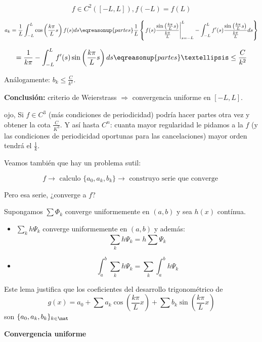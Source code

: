 		\[ f \in C^2 ([-L,L]), f(-L) = f(L) \]

		\[a_k = \frac{1}{L} \int^L_{-L} \cos \left( \frac{k \pi}{L} s \right) f(s) ds \eqreasonup{partes} \frac{1}{L} \left\{ \left. f(s) \frac{\sin \left( \frac{k \pi}{L} s \right)}{\frac{k \pi}{L}} \right|_{s=-L}^{L} -  \int^L_{-L} f'(s) \frac{\sin \left( \frac{k \pi}{L} s \right)}{\frac{k \pi}{L}} ds   \right\}  \]

		\[ = \frac{1}{k\pi} -  \int^L_{-L} f'(s) \sin \left( \frac{k \pi}{L} s \right) ds \eqreasonup{partes} … \leq \frac{C}{k^2} \]

		Análogamente: $b_k \leq \frac{C}{k^2}$.


		\textbf{Conclusión:} criterio de Weierstrass $\Rightarrow$ convergencia uniforme en $[-L,L]$.

		\obs ojo, Si $f \in C^3$ (más condiciones de periodicidad) podría hacer partes otra vez y obtener la cota $\frac{C}{K^3}$. Y así hasta $C^n$: cuanta mayor regularidad le pidamos a la $f$ (y las condiciones de periodicidad oportunas para las cancelaciones) mayor orden tendrá el $\frac{1}{k}$.

		Veamos también que hay un problema sutil:

		\[f \rightarrow \text{ calculo } \{a_0,a_k,b_k\} \rightarrow \text{ construyo serie que converge } \]

		Pero esa serie, ¿converge a $f$?

		\begin{lemma}
			Supongamos $\sum \Phi_k$ converge uniformemente en $(a,b)$ y sea $h(x)$ contínua.

			\begin{itemize}
				\item $\sum_k h \Psi_k$ converge uniformemente en $(a,b)$ y además:
				\[ \sum_k h \Psi_k = h \sum \Psi_k\]

				\item \[\int_a^b \sum_k h \Psi_k = \sum_k \int_a^b h \Psi_k \]
			\end{itemize}

		\end{lemma}

		Este lema justifica que los coeficientes del desarrollo trigonométrico de$$g(x) = a_0 + \sum a_k \cos \left( \frac{k \pi}{L} x \right) + \sum b_k \sin \left( \frac{k \pi}{L} x \right) $$ son $\{a_0,a_k,b_k\}_{k \in \nat}$

		\textbf{Convergencia uniforme}

